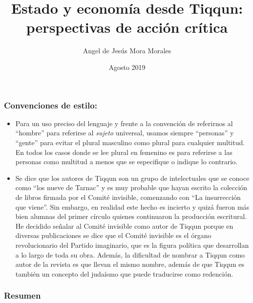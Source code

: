 \documentclass[
]{article}
\title{Estado y economía desde Tiqqun: perspectivas de acción crítica}
\author{Angel de Jesús Mora Morales}
\date{Agosto 2019}
\providecommand{\tightlist}{%
  \setlength{\itemsep}{0pt}\setlength{\parskip}{0pt}}
\begin{document}
\maketitle

\hypertarget{convenciones-de-estilo}{%
\subsubsection{Convenciones de estilo:}\label{convenciones-de-estilo}}

\begin{itemize}
\tightlist
\item
  Para un uso preciso del lenguaje y frente a la convención de
  referirnos al ``hombre'' para referirse al \emph{sujeto} universal,
  usamos siempre ``personas'' y ``gente'' para evitar el plural
  masculino como plural para cualquier multitud. En todos los casos
  donde se lee plural en femenino es para referirse a las personas como
  multitud a menos que se especifique o indique lo contrario.
\item
  Se dice que los autores de Tiqqun son un grupo de intelectuales que se
  conoce como ``los nueve de Tarnac'' y es muy probable que hayan
  escrito la colección de libros firmada por el Comité invisible,
  comenzando con ``La insurrección que viene''. Sin embargo, en realidad
  este hecho es incierto y quizá fueron más bien alumnas del primer
  círculo quienes continuaron la producción escritural. He decidido
  señalar al Comité invisible como autor de Tiqqun porque en diversas
  publicaciones se dice que el Comité invisible es el órgano
  revolucionario del Partido imaginario, que es la figura política que
  desarrollan a lo largo de toda su obra. Además, la dificultad de
  nombrar a Tiqqun como autor de la revista es que llevan el mismo
  nombre, además de que Tiqqun es también un concepto del judaísmo que
  puede traducirse como redención.
\end{itemize}

\hypertarget{resumen}{%
\subsubsection{Resumen}\label{resumen}}
\end{document}
